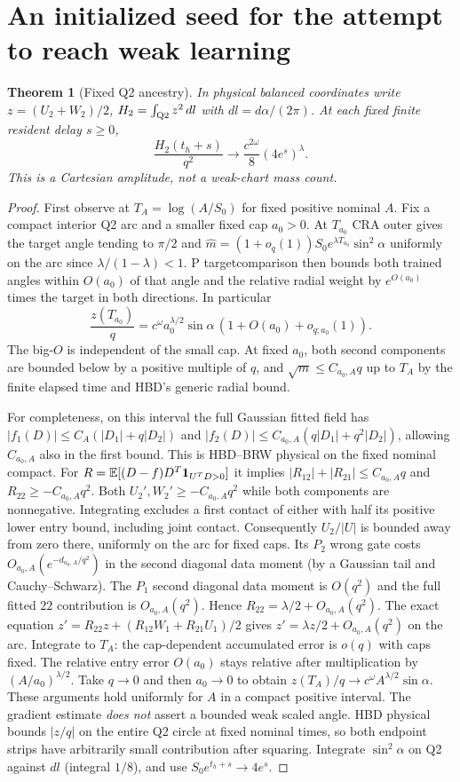 \documentclass[11pt]{article}
\newtheorem{theorem}{Theorem}\newtheorem{lemma}{Lemma}
\begin{document}
\section{An initialized seed for the attempt to reach weak learning}
\begin{theorem}[Fixed Q2 ancestry]\label{an04tbwv1:seed}
In physical balanced coordinates write $z=(U_2+W_2)/2$,
$H_2=\int_{\rm Q2} z^2\,dl$ with $dl=d\alpha/(2\pi)$.
At each fixed finite resident delay $s\ge0$,
\[
 \frac{H_2(t_h+s)}{q^2}\longrightarrow
                  \frac{c^{2\omega}}8(4e^s)^\lambda .
\]
This is a Cartesian amplitude, not a weak-chart mass count.
\end{theorem}
\begin{proof}
First observe at $T_A=\log(A/S_0)$ for fixed positive nominal $A$.
Fix a compact interior Q2 arc and a smaller fixed cap $a_0>0$.
At $T_{a_0}$ CRA outer gives the target angle tending to $\pi/2$
and $\widehat m=(1+o_q(1))S_0 e^{\lambda T_{a_0}}\sin^2\alpha$
uniformly on the arc since $\lambda/(1-\lambda)<1$.
P targetcomparison then bounds both trained angles within $O(a_0)$
of that angle and the relative radial weight by $e^{O(a_0)}$
times the target in both directions. In particular
\[
 \frac{z(T_{a_0})}{q}
   =c^\omega a_0^{\lambda/2}\sin\alpha\,
       (1+O(a_0)+o_{q;a_0}(1)).
\]
The big-$O$ is independent of the small cap. At fixed $a_0$,
both second components are bounded below by a positive multiple
of $q$, and $\sqrt m\le C_{a_0,A}q$ up to $T_A$ by the finite
elapsed time and HBD's generic radial bound.

For completeness, on this interval the full Gaussian fitted field
has $|f_1(D)|\le C_A(|D_1|+q|D_2|)$ and
$|f_2(D)|\le C_{a_0,A}(q|D_1|+q^2|D_2|)$, allowing $C_{a_0,A}$
also in the first bound. This is HBD--BRW physical on the fixed
nominal compact. For $R=\mathbb E[(D-f)D^T{\bf1}_{U^TD>0}]$ it implies
$|R_{12}|+|R_{21}|\le C_{a_0,A}q$ and $R_{22}\ge-C_{a_0,A}q^2$.
Both $U_2',W_2'\ge-C_{a_0,A}q^2$ while both components are
nonnegative. Integrating excludes a first contact of either with
half its positive lower entry bound, including joint contact.
Consequently $U_2/|U|$ is bounded away from zero there, uniformly
on the arc for fixed caps. Its $P_2$ wrong gate costs
$O_{a_0,A}(e^{-d_{a_0,A}/q^2})$ in the second diagonal data moment
(by a Gaussian tail and Cauchy--Schwarz). The $P_1$ second diagonal
data moment is $O(q^2)$ and the full fitted $22$ contribution is
$O_{a_0,A}(q^2)$. Hence $R_{22}=\lambda/2+O_{a_0,A}(q^2)$.
The exact equation
$z'=R_{22}z+(R_{12}W_1+R_{21}U_1)/2$ gives
$z'=\lambda z/2+O_{a_0,A}(q^2)$ on the arc.
Integrate to $T_A$: the cap-dependent accumulated error is $o(q)$
with caps fixed. The relative entry error $O(a_0)$ stays relative
after multiplication by $(A/a_0)^{\lambda/2}$. Take $q\to0$ and
then $a_0\to0$ to obtain $z(T_A)/q\to c^\omega A^{\lambda/2}\sin\alpha$.
These arguments hold uniformly for $A$ in a compact positive interval.
The gradient estimate \emph{does not} assert a bounded weak scaled
angle. HBD physical bounds $|z/q|$ on the entire Q2 circle at fixed
nominal times, so both endpoint strips have arbitrarily small
contribution after squaring. Integrate $\sin^2\alpha$ on Q2 against
$dl$ (integral $1/8$), and use $S_0e^{t_h+s}\to4e^s$.
\end{proof}
\end{document}
